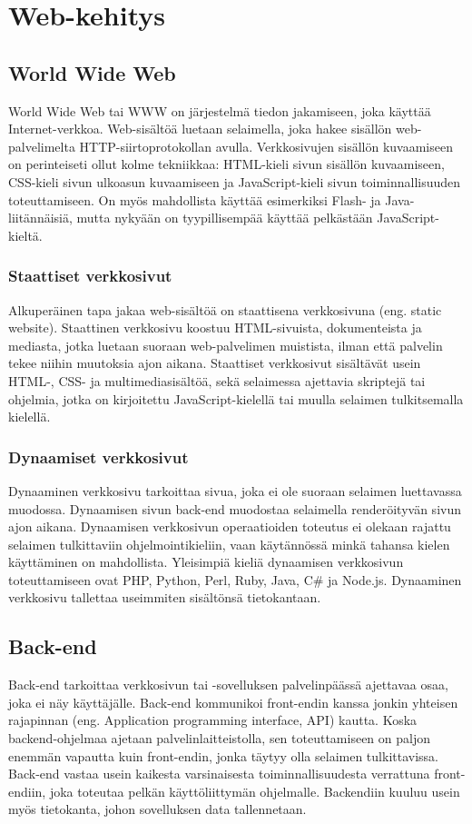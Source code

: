 \chapter{Web-kehitys}

\section{World Wide Web}
World Wide Web tai WWW on järjestelmä tiedon jakamiseen, joka käyttää Internet-verkkoa. Web-sisältöä luetaan selaimella,
joka hakee sisällön web-palvelimelta HTTP-siirtoprotokollan avulla. Verkkosivujen sisällön kuvaamiseen on perinteiseti
ollut kolme tekniikkaa: HTML-kieli sivun sisällön kuvaamiseen, CSS-kieli sivun ulkoasun kuvaamiseen ja JavaScript-kieli
sivun toiminnallisuuden toteuttamiseen. On myös mahdollista käyttää esimerkiksi Flash- ja Java-liitännäisiä, mutta
nykyään on tyypillisempää käyttää pelkästään JavaScript-kieltä. \cite{javascriptguide}

\subsection{Staattiset verkkosivut}
Alkuperäinen tapa jakaa web-sisältöä on staattisena verkkosivuna (eng. static website). Staattinen verkkosivu koostuu
HTML-sivuista, dokumenteista ja mediasta, jotka luetaan suoraan web-palvelimen muistista, ilman että palvelin tekee
niihin muutoksia ajon aikana. Staattiset verkkosivut sisältävät usein HTML-, CSS- ja multimediasisältöä, sekä selaimessa
ajettavia skriptejä tai ohjelmia, jotka on kirjoitettu JavaScript-kielellä tai muulla selaimen tulkitsemalla kielellä.
\cite{staticdynamicwebsites}

\subsection{Dynaamiset verkkosivut}
Dynaaminen verkkosivu tarkoittaa sivua, joka ei ole suoraan selaimen luettavassa muodossa. Dynaamisen sivun back-end
muodostaa selaimella renderöityvän sivun ajon aikana. Dynaamisen verkkosivun operaatioiden toteutus ei olekaan rajattu
selaimen tulkittaviin ohjelmointikieliin, vaan käytännössä minkä tahansa kielen käyttäminen on mahdollista. Yleisimpiä
kieliä dynaamisen verkkosivun toteuttamiseen ovat PHP, Python, Perl, Ruby, Java, C\# ja Node.js. Dynaaminen verkkosivu
tallettaa useimmiten sisältönsä tietokantaan. \cite{staticdynamicwebsites}

\section{Back-end}
Back-end tarkoittaa verkkosivun tai -sovelluksen palvelinpäässä ajettavaa osaa, joka ei näy käyttäjälle. Back-end
kommunikoi front-endin kanssa jonkin yhteisen rajapinnan (eng. Application programming interface, API) kautta. Koska
backend-ohjelmaa ajetaan palvelinlaitteistolla, sen toteuttamiseen on paljon enemmän vapautta kuin front-endin, jonka
täytyy olla selaimen tulkittavissa. Back-end vastaa usein kaikesta varsinaisesta toiminnallisuudesta verrattuna
front-endiin, joka toteutaa pelkän käyttöliittymän ohjelmalle. Backendiin kuuluu usein myös tietokanta, johon
sovelluksen data tallennetaan. \cite{fullstackdeveloper}


